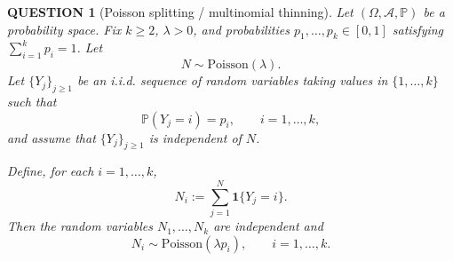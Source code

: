 \documentclass[12pt]{article}
\renewcommand{\(}{\left(}%
\renewcommand{\)}{\right)}%
\renewcommand{\[}{\left[}%
\renewcommand{\]}{\right]}%
\newtheorem{question}{QUESTION}[section]}
\begin{document}
\begin{question}[Poisson splitting / multinomial thinning]
Let $(\Omega,\mathcal A,\mathbb P)$ be a probability space. Fix $k\ge2$, 
$\lambda>0$, and probabilities $p_1,\dots,p_k\in[0,1]$ satisfying
$\sum_{i=1}^k p_i=1$.
Let
\begin{equation*}
N \sim \mathrm{Poisson}(\lambda).
\end{equation*}
Let $\{Y_j\}_{j\ge1}$ be an i.i.d. sequence of random variables taking
values in $\{1,\dots,k\}$ such that
\begin{equation*}
\mathbb P(Y_j=i)=p_i,\qquad i=1,\dots,k,
\end{equation*}
and assume that $\{Y_j\}_{j\ge1}$ is independent of $N$.

Define, for each $i=1,\dots,k$,
\begin{equation*}
N_i:=\sum_{j=1}^{N} \mathbf 1\{Y_j=i\}.
\end{equation*}
Then the random variables $N_1,\dots,N_k$ are independent and
\begin{equation*}
N_i \sim \mathrm{Poisson}(\lambda p_i),\qquad i=1,\dots,k.
\end{equation*}
\end{question}
\end{document}
